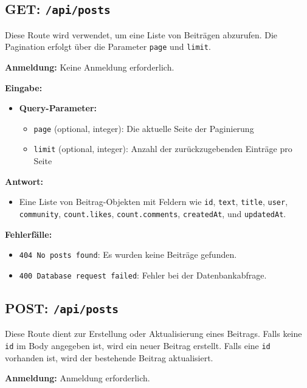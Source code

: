 \documentclass[a4paper,12pt]{article}
\begin{document}
\subsection{GET: \texttt{/api/posts}}

Diese Route wird verwendet, um eine Liste von Beiträgen abzurufen. Die Pagination erfolgt über die Parameter \texttt{page} und \texttt{limit}.

\textbf{Anmeldung:} Keine Anmeldung erforderlich.

\textbf{Eingabe:}
\begin{itemize}
    \item \textbf{Query-Parameter:}
    \begin{itemize}
        \item \texttt{page} (optional, integer): Die aktuelle Seite der Paginierung
        \item \texttt{limit} (optional, integer): Anzahl der zurückzugebenden Einträge pro Seite
    \end{itemize}
\end{itemize}

\textbf{Antwort:}
\begin{itemize}
    \item Eine Liste von Beitrag-Objekten mit Feldern wie \texttt{id}, \texttt{text}, \texttt{title}, \texttt{user}, \texttt{community}, \texttt{count.likes}, \texttt{count.comments}, \texttt{createdAt}, und \texttt{updatedAt}.
\end{itemize}

\textbf{Fehlerfälle:}
\begin{itemize}
    \item \texttt{404 No posts found}: Es wurden keine Beiträge gefunden.
    \item \texttt{400 Database request failed}: Fehler bei der Datenbankabfrage.
\end{itemize}

\subsection{POST: \texttt{/api/posts}}

Diese Route dient zur Erstellung oder Aktualisierung eines Beitrags. Falls keine \texttt{id} im Body angegeben ist, wird ein neuer Beitrag erstellt. Falls eine \texttt{id} vorhanden ist, wird der bestehende Beitrag aktualisiert.

\textbf{Anmeldung:} Anmeldung erforderlich.
\end{document}
